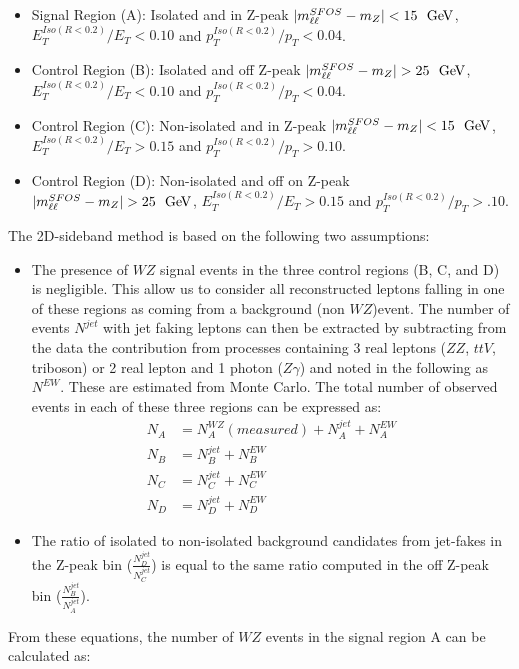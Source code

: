\begin{itemize}
	\item Signal Region (A): Isolated and in Z-peak $|m_{\ell\ell}^{SFOS}-m_{Z}|<15~\GeV$, $E_{T}^{Iso(R<0.2)}/E_{T}<0.10$ and $p_{T}^{Iso(R<0.2)}/p_{T}<0.04$.
	\item Control Region (B): Isolated and off Z-peak $|m_{\ell\ell}^{SFOS}-m_{Z}|>25~\GeV$, $E_{T}^{Iso(R<0.2)}/E_{T}<0.10$ and $p_{T}^{Iso(R<0.2)}/p_{T}<0.04$.
	\item Control Region (C): Non-isolated and in Z-peak $|m_{\ell\ell}^{SFOS}-m_{Z}|<15~\GeV$, $E_{T}^{Iso(R<0.2)}/E_{T}>0.15$ and $p_{T}^{Iso(R<0.2)}/p_{T}>0.10$.
	\item Control Region (D): Non-isolated and off on Z-peak $|m_{\ell\ell}^{SFOS}-m_{Z}|>25~\GeV$, $E_{T}^{Iso(R<0.2)}/E_{T}>0.15$ and $p_{T}^{Iso(R<0.2)}/p_{T}>.10$.
	
\end{itemize}


The 2D-sideband method is based on the following two assumptions:
\begin{itemize}
\item The presence of $WZ$ signal events in the three control regions (B,
  C, and D) is negligible. This allow us to consider all
  reconstructed leptons falling in one of these regions as coming from a
  background (non $WZ$)event. The number of events $N^{jet}$ with jet faking leptons can then
  be extracted by subtracting from the data the contribution from processes containing 
  3 real leptons ($ZZ$, $ttV$, triboson) or 2 real lepton and 1 photon ($Z\gamma$)
  and noted in the following as $N^{EW}$. These are estimated from Monte Carlo. The total number of
  observed events in each of these three regions can be expressed as:
  \begin{align}
  N_A &= N_A^{WZ}(measured)+N_A^{jet}+N_A^{EW} \\
  N_B &= N_B^{jet}+N_B^{EW} \\
  N_C &= N_C^{jet}+N_C^{EW} \\
  N_D &= N_D^{jet}+N_D^{EW} 
  \end{align}

\item The ratio of isolated to non-isolated background candidates from
  jet-fakes in the Z-peak bin ($\frac{N_D^{jet}}{N_C^{jet}}$)
  is equal to the same ratio computed in the off Z-peak bin ($\frac{N_B^{jet}}{N_A^{jet}}$).
\end{itemize}

From these equations, the number of $WZ$ events in the signal region A can be calculated as:

